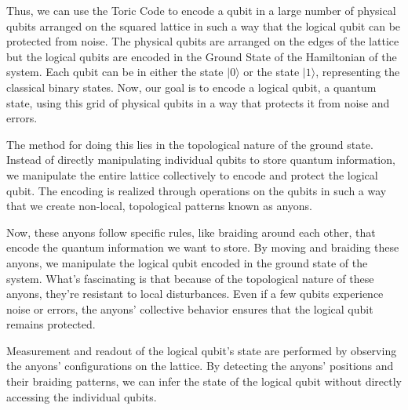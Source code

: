 \documentclass[12pt]{report}
\begin{document}
	\begin{minipage}{1 \textwidth}
		
		
		Thus, we can use the Toric Code to encode a qubit in a large number of physical qubits arranged on the squared lattice in such a way that the logical qubit can be protected from noise. 
		The physical qubits are arranged on the edges of the lattice but the logical qubits are encoded in the Ground State of the Hamiltonian of the system. 
	    Each qubit can be in either the state $|0 \rangle$ or the state $|1\rangle$, representing the classical binary states. Now, our goal is to encode a logical qubit, a quantum state, using this grid of physical qubits in a way that protects it from noise and errors. \newline

		The method for doing this lies in the topological nature of the ground state. Instead of directly manipulating individual qubits to store quantum information, we manipulate the entire lattice collectively to encode and protect the logical qubit.
		The encoding is realized through operations on the qubits in such a way that we create non-local, topological patterns known as anyons.\newline
		
		Now, these anyons follow specific rules, like braiding around each other, that encode the quantum information we want to store. By moving and braiding these anyons, we manipulate the logical qubit encoded in the ground state of the system.
		What's fascinating is that because of the topological nature of these anyons, they're resistant to local disturbances. 
		Even if a few qubits experience noise or errors, the anyons' collective behavior ensures that the logical qubit remains protected. \newline
		
		Measurement and readout of the logical qubit's state are performed by observing the anyons' configurations on the lattice. By detecting the anyons' positions and their braiding patterns, we can infer the state of the logical qubit without directly accessing the individual qubits. \newline
	
		
	\end{minipage}
	
	
	
\end{document}
